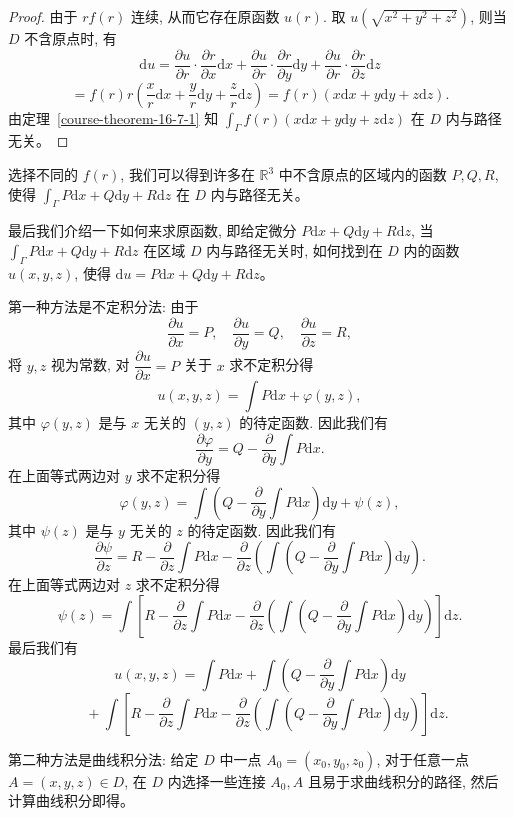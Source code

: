 \documentclass[12pt,fontset=fandol]{ctexart}
\begin{document}
\begin{proof}\quad 由于 $rf(r)$ 连续, 从而它存在原函数 $u(r)$. 取 $u(\sqrt{x^2+y^2+z^2})$, 则当 $D$ 不含原点时, 有
\[
  \mathrm du
  =\frac{\partial u}{\partial r}\cdot\frac{\partial r}{\partial x}\mathrm dx
  +\frac{\partial u}{\partial r}\cdot\frac{\partial r}{\partial y}\mathrm dy
  +\frac{\partial u}{\partial r}\cdot\frac{\partial r}{\partial z}\mathrm dz
\]
\[
  =f(r)r\left(\frac{x}{r}\mathrm dx+\frac{y}{r}\mathrm dy+\frac{z}{r}\mathrm dz\right)
  =f(r)(x\mathrm dx+y\mathrm dy+z\mathrm dz).
\]
由定理~\ref{course-theorem-16-7-1}  知 $\int_\Gamma f(r)(x\mathrm dx+y\mathrm dy+z\mathrm dz)$ 在 $D$ 内与路径无关。

\end{proof}
\begin{remark}\quad 选择不同的 $f(r)$, 我们可以得到许多在 $\mathbb R^3$ 中不含原点的区域内的函数 $P,Q,R$, 使得 $\int_\Gamma P\mathrm dx+Q\mathrm dy+R\mathrm dz$ 在 $D$ 内与路径无关。

最后我们介绍一下如何来求原函数, 即给定微分 $P\mathrm dx+Q\mathrm dy+R\mathrm dz$, 当 $\int_\Gamma P\mathrm dx+Q\mathrm dy+R\mathrm dz$ 在区域 $D$ 内与路径无关时, 如何找到在 $D$ 内的函数 $u(x,y,z)$, 使得 $\mathrm du=P\mathrm dx+Q\mathrm dy+R\mathrm dz$。

第一种方法是不定积分法: 由于
\[
  \frac{\partial u}{\partial x}=P,\quad
  \frac{\partial u}{\partial y}=Q,\quad
  \frac{\partial u}{\partial z}=R,
\]
将 $y,z$ 视为常数, 对 $\dfrac{\partial u}{\partial x}=P$ 关于 $x$ 求不定积分得
\[
  u(x,y,z)=\int P\mathrm dx+\varphi(y,z),
\]
其中 $\varphi(y,z)$ 是与 $x$ 无关的 $(y,z)$ 的待定函数. 因此我们有
\[
  \frac{\partial\varphi}{\partial y}
  =Q-\frac{\partial}{\partial y}\int P\mathrm dx.
\]
在上面等式两边对 $y$ 求不定积分得
\[
  \varphi(y,z)=\int\left(Q-\frac{\partial}{\partial y}\int P\mathrm dx\right)\mathrm dy+\psi(z),
\]
其中 $\psi(z)$ 是与 $y$ 无关的 $z$ 的待定函数. 因此我们有
\[
  \frac{\partial\psi}{\partial z}
  =
  R-\frac{\partial}{\partial z}\int P\mathrm dx
  -\frac{\partial}{\partial z}
  \left(\int\left(Q-\frac{\partial}{\partial y}\int P\mathrm dx\right)\mathrm dy\right).
\]
在上面等式两边对 $z$ 求不定积分得
\[
  \psi(z)=\int\left[
  R-\frac{\partial}{\partial z}\int P\mathrm dx
  -\frac{\partial}{\partial z}
  \left(\int\left(Q-\frac{\partial}{\partial y}\int P\mathrm dx\right)\mathrm dy\right)
  \right]\mathrm dz.
\]
最后我们有
\[
  u(x,y,z)=\int P\mathrm dx
  +\int\left(Q-\frac{\partial}{\partial y}\int P\mathrm dx\right)\mathrm dy
\]
\[
  \quad+\int\left[
  R-\frac{\partial}{\partial z}\int P\mathrm dx
  -\frac{\partial}{\partial z}
  \left(\int\left(Q-\frac{\partial}{\partial y}\int P\mathrm dx\right)\mathrm dy\right)
  \right]\mathrm dz.
\]

第二种方法是曲线积分法: 给定 $D$ 中一点 $A_0=(x_0,y_0,z_0)$, 对于任意一点 $A=(x,y,z)\in D$, 在 $D$ 内选择一些连接 $A_0,A$ 且易于求曲线积分的路径, 然后计算曲线积分即得。

\end{remark}
\end{document}
